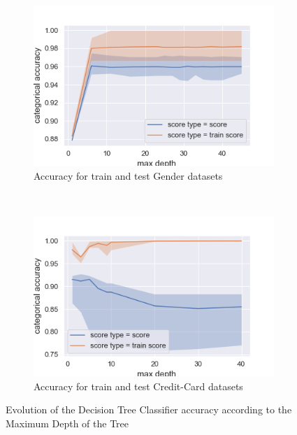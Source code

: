 \documentclass[10pt]{article}
\begin{document}
		\paragraph*{}
			\begin{figure}[h]
				\centering
				\begin{subfigure}[]{0.45\columnwidth}
					\centering
					\includegraphics[width=\linewidth]{../graphics/tree_gender_max_depth_score_type_score_type.png}
					\caption{Accuracy for train and test Gender datasets}
					\label{tree:gender_train_vs_test}
				\end{subfigure}
				~
				\begin{subfigure}[]{0.45\columnwidth}
					\centering
					\includegraphics[width=\linewidth]{../graphics/tree_creditcard_max_depth_score_type_score_type.png}
					\caption{Accuracy for train and test Credit-Card datasets}
					\label{tree:creditcard_train_vs_test}
				\end{subfigure}
				\caption{Evolution of the Decision Tree Classifier accuracy according to the Maximum Depth of the Tree}
				\label{tree:train_vs_test}
			\end{figure}
\end{document}

